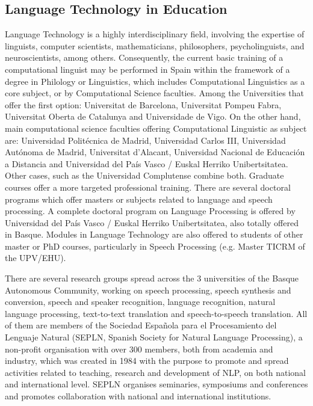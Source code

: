 \begin{multicols}{2}
\subsection{Language Technology in Education}
   Language Technology is a highly interdisciplinary field, involving the expertise of linguists, computer scientists, mathematicians, philosophers, psycholinguists, and neuroscientists, among others. Consequently, the current basic training of a computational linguist may be performed in Spain within the framework of a degree in Philology or Linguistics, which includes Computational Linguistics as a core subject, or by Computational Science faculties. 
Among the Universities that offer the first option: Universitat de Barcelona, Universitat Pompeu Fabra, Universitat Oberta de Catalunya and Universidade de Vigo. On the other hand, main computational science faculties offering Computational Linguistic as subject are: Universidad Politécnica de Madrid, Universidad Carlos III, Universidad Autónoma de Madrid, Universitat d’Alacant, Universidad Nacional de Educación a Distancia and Universidad del País Vasco / Euskal Herriko Unibertsitatea. Other cases, such as the Universidad Complutense combine both.
Graduate courses offer a more targeted professional training. There are several doctoral programs which offer masters or subjects related to language and speech processing. A complete doctoral program on Language Processing is offered by Universidad del País Vasco / Euskal Herriko Unibertsitatea, also totally offered in Basque. Modules in Language Technology are also offered to students of other master or PhD courses, particularly in Speech Processing (e.g. Master TICRM of the UPV/EHU). 

There are several research groups spread across the 3 universities of the Basque Autonomous Community, working on speech processing, speech synthesis and conversion, speech and speaker recognition, language recognition, natural language processing, text-to-text translation and speech-to-speech translation. All of them are members of the Sociedad Española para el Procesamiento del Lenguaje Natural (SEPLN, Spanish Society for Natural Language Processing), a non-profit organisation with over 300 members, both from academia and industry, which was created in 1984 with the purpose to promote and spread activities related to teaching, research and development of NLP, on both national and international level. SEPLN organises seminaries, symposiums and conferences and promotes collaboration with national and international institutions.


\end{multicols}

